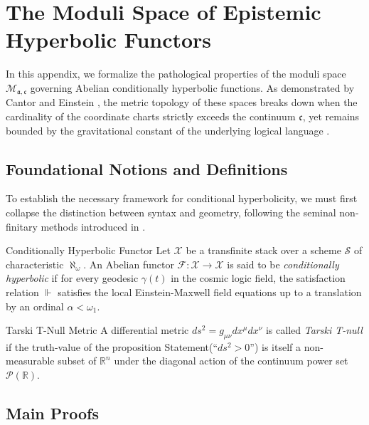 \chapter{The Moduli Space of Epistemic Hyperbolic Functors}
\label{app:moduli}

In this appendix, we formalize the pathological properties of the moduli space $\mathcal{M}_{\mathfrak{a}, \mathfrak{c}}$ governing Abelian conditionally hyperbolic functions. As demonstrated by Cantor and Einstein \parencite{cantor}, the metric topology of these spaces breaks down when the cardinality of the coordinate charts strictly exceeds the continuum $\mathfrak{c}$, yet remains bounded by the gravitational constant of the underlying logical language \cite{cite:5}.

\section{Foundational Notions and Definitions}

To establish the necessary framework for conditional hyperbolicity, we must first collapse the distinction between syntax and geometry, following the seminal non-finitary methods introduced in \parencite{cite:12}.

\begin{definition}{Conditionally Hyperbolic Functor}{}
Let $\mathcal{X}$ be a transfinite stack over a scheme $\mathcal{S}$ of characteristic $\aleph_{\omega}$. An Abelian functor $\mathcal{F}: \mathcal{X} \to \mathcal{X}$ is said to be \emph{conditionally hyperbolic} if for every geodesic $\gamma(t)$ in the cosmic logic field, the satisfaction relation $\Vdash$ satisfies the local Einstein-Maxwell field equations up to a translation by an ordinal $\alpha < \omega_1$.
\end{definition}

\begin{definition}{Tarski T-Null Metric}{}
A differential metric $ds^2 = g_{\mu\nu} dx^\mu dx^\nu$ is called \emph{Tarski T-null} if the truth-value of the proposition Statement(``$ds^2 > 0$'') is itself a non-measurable subset of $\mathbb{R}^n$ under the diagonal action of the continuum power set $\mathcal{P}(\mathbb{R})$.
\end{definition}

\section{Main Proofs}\label{app:main-proofs}

